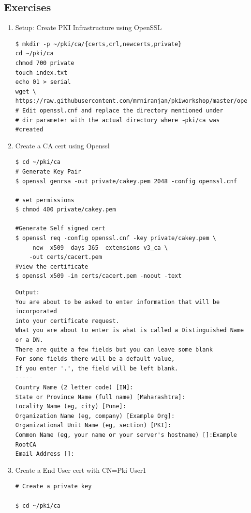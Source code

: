 \documentclass[a4paper]{article}
\begin{document}
    \subsection{Exercises}
\begin{enumerate}[label*=\arabic*.]
    \item Setup: Create PKI Infrastructure using OpenSSL
        \begin{lstlisting}[style=BashInputStyle]
$ mkdir -p ~/pki/ca/{certs,crl,newcerts,private}
cd ~/pki/ca
chmod 700 private
touch index.txt
echo 01 > serial
wget \
https://raw.githubusercontent.com/mrniranjan/pkiworkshop/master/openssl.cnf
# Edit openssl.cnf and replace the directory mentioned under
# dir parameter with the actual directory where ~pki/ca was
#created
        \end{lstlisting}
    \item Create a CA cert using Openssl
        \begin{lstlisting}[style=BashInputStyle]
$ cd ~/pki/ca
# Generate Key Pair
$ openssl genrsa -out private/cakey.pem 2048 -config openssl.cnf

# set permissions
$ chmod 400 private/cakey.pem

#Generate Self signed cert
$ openssl req -config openssl.cnf -key private/cakey.pem \
    -new -x509 -days 365 -extensions v3_ca \
    -out certs/cacert.pem
#view the certificate    
$ openssl x509 -in certs/cacert.pem -noout -text
        \end{lstlisting}
        \begin{lstlisting}
Output:
You are about to be asked to enter information that will be incorporated
into your certificate request.
What you are about to enter is what is called a Distinguished Name or a DN.
There are quite a few fields but you can leave some blank
For some fields there will be a default value,
If you enter '.', the field will be left blank.
-----
Country Name (2 letter code) [IN]:
State or Province Name (full name) [Maharashtra]:
Locality Name (eg, city) [Pune]:
Organization Name (eg, company) [Example Org]:
Organizational Unit Name (eg, section) [PKI]:
Common Name (eg, your name or your server's hostname) []:Example RootCA
Email Address []:
        \end{lstlisting}
    \item Create a End User cert with CN=Pki User1
        \begin{lstlisting}[style=BashInputStyle]
# Create a private key
        
$ cd ~/pki/ca
        

\end{lstlisting}
\end{enumerate}
\end{document}
